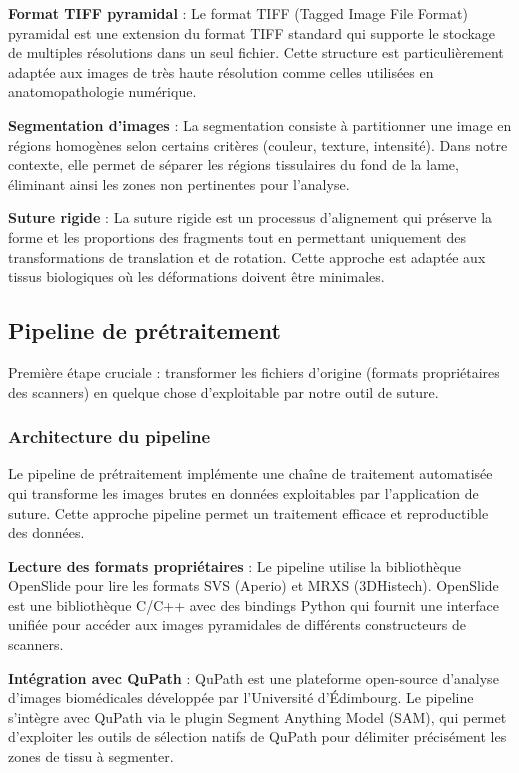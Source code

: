 \documentclass[11pt,a4paper]{report}
\begin{document}
\textbf{Format TIFF pyramidal} : Le format TIFF (Tagged Image File Format) pyramidal est une extension du format TIFF standard qui supporte le stockage de multiples résolutions dans un seul fichier. Cette structure est particulièrement adaptée aux images de très haute résolution comme celles utilisées en anatomopathologie numérique.

\textbf{Segmentation d'images} : La segmentation consiste à partitionner une image en régions homogènes selon certains critères (couleur, texture, intensité). Dans notre contexte, elle permet de séparer les régions tissulaires du fond de la lame, éliminant ainsi les zones non pertinentes pour l'analyse.

\textbf{Suture rigide} : La suture rigide est un processus d'alignement qui préserve la forme et les proportions des fragments tout en permettant uniquement des transformations de translation et de rotation. Cette approche est adaptée aux tissus biologiques où les déformations doivent être minimales.

\subsection{Pipeline de prétraitement}

Première étape cruciale : transformer les fichiers d'origine (formats propriétaires des scanners) en quelque chose d'exploitable par notre outil de suture.

\subsubsection{Architecture du pipeline}

Le pipeline de prétraitement implémente une chaîne de traitement automatisée qui transforme les images brutes en données exploitables par l'application de suture. Cette approche pipeline permet un traitement efficace et reproductible des données.

\textbf{Lecture des formats propriétaires} : Le pipeline utilise la bibliothèque OpenSlide pour lire les formats SVS (Aperio) et MRXS (3DHistech). OpenSlide est une bibliothèque C/C++ avec des bindings Python qui fournit une interface unifiée pour accéder aux images pyramidales de différents constructeurs de scanners.

\textbf{Intégration avec QuPath} : QuPath est une plateforme open-source d'analyse d'images biomédicales développée par l'Université d'Édimbourg. Le pipeline s'intègre avec QuPath via le plugin Segment Anything Model (SAM), qui permet d'exploiter les outils de sélection natifs de QuPath pour délimiter précisément les zones de tissu à segmenter.
\end{document}
